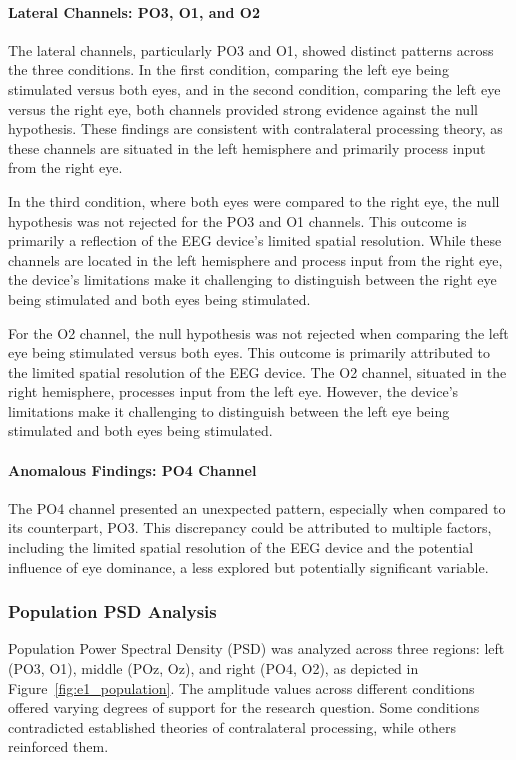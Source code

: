 \paragraph{Lateral Channels: PO3, O1, and O2}
The lateral channels, particularly PO3 and O1, showed distinct patterns across the three conditions. In the first condition, comparing the left eye being stimulated versus both eyes, and in the second condition, comparing the left eye versus the right eye, both channels provided strong evidence against the null hypothesis. These findings are consistent with contralateral processing theory, as these channels are situated in the left hemisphere and primarily process input from the right eye.

In the third condition, where both eyes were compared to the right eye, the null hypothesis was not rejected for the PO3 and O1 channels. This outcome is primarily a reflection of the EEG device's limited spatial resolution. While these channels are located in the left hemisphere and process input from the right eye, the device's limitations make it challenging to distinguish between the right eye being stimulated and both eyes being stimulated.

For the O2 channel, the null hypothesis was not rejected when comparing the left eye being stimulated versus both eyes. This outcome is primarily attributed to the limited spatial resolution of the EEG device. The O2 channel, situated in the right hemisphere, processes input from the left eye. However, the device's limitations make it challenging to distinguish between the left eye being stimulated and both eyes being stimulated.

\paragraph{Anomalous Findings: PO4 Channel}
The PO4 channel presented an unexpected pattern, especially when compared to its counterpart, PO3. This discrepancy could be attributed to multiple factors, including the limited spatial resolution of the EEG device and the potential influence of eye dominance, a less explored but potentially significant variable.

\subsubsection{Population PSD Analysis}
Population Power Spectral Density (PSD) was analyzed across three regions: left (PO3, O1), middle (POz, Oz), and right (PO4, O2), as depicted in Figure~\ref{fig:e1_population}. The amplitude values across different conditions offered varying degrees of support for the research question. Some conditions contradicted established theories of contralateral processing, while others reinforced them.

